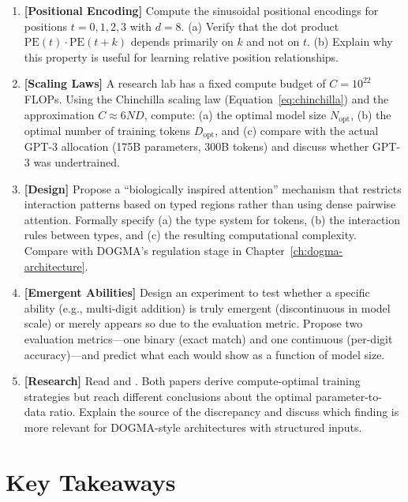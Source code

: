\begin{enumerate}[label=\textbf{5.\arabic*.}, leftmargin=2.5em]
\item \textbf{[Positional Encoding]} Compute the sinusoidal positional encodings for positions $t = 0, 1, 2, 3$ with $d = 8$. (a) Verify that the dot product $\text{PE}(t) \cdot \text{PE}(t+k)$ depends primarily on $k$ and not on $t$. (b) Explain why this property is useful for learning relative position relationships.

\item \textbf{[Scaling Laws]} A research lab has a fixed compute budget of $C = 10^{22}$ FLOPs. Using the Chinchilla scaling law (Equation~\ref{eq:chinchilla}) and the approximation $C \approx 6ND$, compute: (a) the optimal model size $N_{\text{opt}}$, (b) the optimal number of training tokens $D_{\text{opt}}$, and (c) compare with the actual GPT-3 allocation (175B parameters, 300B tokens) and discuss whether GPT-3 was undertrained.

\item \textbf{[Design]} Propose a ``biologically inspired attention'' mechanism that restricts interaction patterns based on typed regions rather than using dense pairwise attention. Formally specify (a) the type system for tokens, (b) the interaction rules between types, and (c) the resulting computational complexity. Compare with DOGMA's regulation stage in Chapter~\ref{ch:dogma-architecture}.

\item \textbf{[Emergent Abilities]} Design an experiment to test whether a specific ability (e.g., multi-digit addition) is truly emergent (discontinuous in model scale) or merely appears so due to the evaluation metric. Propose two evaluation metrics---one binary (exact match) and one continuous (per-digit accuracy)---and predict what each would show as a function of model size.

\item \textbf{[Research]} Read \citet{kaplan2020} and \citet{hoffmann2022}. Both papers derive compute-optimal training strategies but reach different conclusions about the optimal parameter-to-data ratio. Explain the source of the discrepancy and discuss which finding is more relevant for DOGMA-style architectures with structured inputs.

\end{enumerate}

\section{Key Takeaways}

